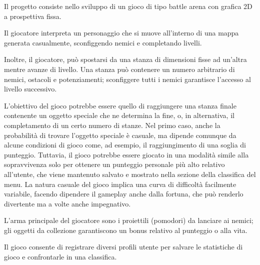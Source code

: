 Il progetto consiste nello sviluppo di un gioco di tipo battle arena con grafica 2D a prospettiva fissa.

Il giocatore interpreta un personaggio che si muove all'interno di una mappa generata casualmente, sconfiggendo nemici e completando livelli.

Inoltre, il giocatore, può spostarsi da una stanza di dimensioni fisse ad un'altra mentre avanze di livello.
Una stanza può contenere un numero arbitrario di nemici, ostacoli e potenziamenti;
sconfiggere tutti i nemici garantisce l'accesso al livello successivo.

L'obiettivo del gioco potrebbe essere quello di raggiungere una stanza finale contenente un oggetto speciale che ne determina la fine, o, in alternativa, il completamento di un certo numero di stanze.
Nel primo caso, anche la probabilità di trovare l'oggetto speciale è casuale, ma dipende comunque da alcune condizioni di gioco come, ad esempio, il raggiungimento di una soglia di punteggio.
Tuttavia, il gioco potrebbe essere giocato in una modalità simile alla sopravvivenza solo per ottenere un punteggio personale più alto relativo all'utente, che viene mantenuto salvato e mostrato nella sezione della classifica del menu.
La natura casuale del gioco implica una curva di difficoltà facilmente variabile, facendo dipendere il gameplay anche dalla fortuna, che può renderlo divertente ma a volte anche impegnativo.

L'arma principale del giocatore sono i proiettili (pomodori) da lanciare ai nemici; gli oggetti da collezione garantiscono un bonus relativo al punteggio o alla vita.

Il gioco consente di registrare diversi profili utente per salvare le statistiche di gioco e confrontarle in una classifica.